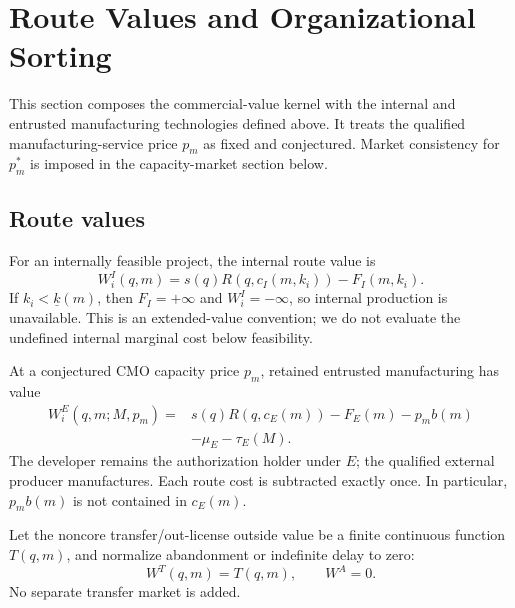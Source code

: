\section{Route Values and Organizational Sorting}
\label{sec:p04-route-sorting}

This section composes the commercial-value kernel with the internal and
entrusted manufacturing technologies defined above. It treats the qualified
manufacturing-service price \(p_m\) as fixed and conjectured. Market
consistency for \(p_m^*\) is imposed in the capacity-market section below.

\subsection{Route values}
\label{subsec:p04-route-values}

For an internally feasible project, the internal route value is
\begin{equation}
  W_i^I(q,m)
  =
  s(q)R\!\left(q,c_I(m,k_i)\right)
  -
  F_I(m,k_i).
  \label{eq:p04-internal-value}
\end{equation}
If \(k_i<\underline{k}(m)\), then \(F_I=+\infty\) and
\(W_i^I=-\infty\), so internal production is unavailable. This is an extended-value convention;
we do not evaluate the undefined internal marginal cost below feasibility.

At a conjectured CMO capacity price \(p_m\), retained entrusted manufacturing
has value
\begin{equation}
  \begin{aligned}
  W_i^E(q,m;M,p_m)
  ={}&
  s(q)R\!\left(q,c_E(m)\right)
  -F_E(m)-p_m b(m)\\
  &-\mu_E-\tau_E(M).
  \end{aligned}
  \label{eq:p04-entrusted-value}
\end{equation}
The developer remains the authorization holder under \(E\); the qualified
external producer manufactures. Each route cost is subtracted exactly once.
In particular, \(p_m b(m)\) is not contained in \(c_E(m)\).

Let the noncore transfer/out-license outside value be a finite continuous
function \(T(q,m)\), and normalize abandonment or indefinite delay to zero:
\begin{equation}
  W^T(q,m)=T(q,m),
  \qquad
  W^A=0.
  \label{eq:p04-outside-values}
\end{equation}
No separate transfer market is added.

